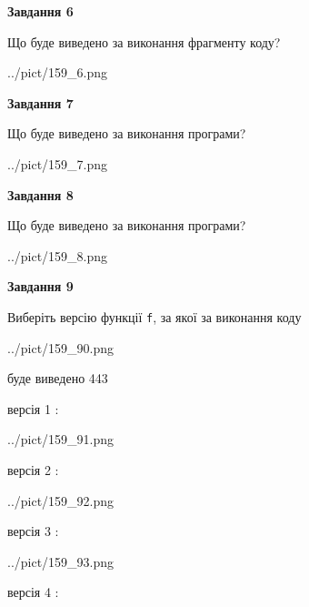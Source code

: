 \documentclass[12pt, ukrainian]{article}
\def\code#1{\Verb!#1!}
\begin{document}
{\begin {large}
{\begin {center}\textbf{Завдання 6}\end {center}}

Що буде виведено за виконання фрагменту коду?\par
\begin{center}
	{../pict/159_6.png}
\end{center}
\newpage

{\begin {center}\textbf{Завдання 7}\end {center}}

Що буде виведено за виконання програми?\par
\begin{center}
	{../pict/159_7.png}
\end{center}
\newpage

{\begin {center}\textbf{Завдання 8}\end {center}}

Що буде виведено за виконання програми?\par
\begin{center}
	{../pict/159_8.png}
\end{center}
\newpage

{\begin {center}\textbf{Завдання 9}\end {center}}

Виберіть версію функції \code{f}, за якої за виконання коду
\begin{center}
	{../pict/159_90.png}
\end{center}
буде виведено 443

\vspace{5mm}
версія 1 :

\begin{center}
	{../pict/159_91.png}
\end{center}
версія 2 :

\begin{center}
	{../pict/159_92.png}
\end{center}
версія 3 :

\begin{center}
	{../pict/159_93.png}
\end{center}
версія 4 :


\end{large}}
\end{document}
